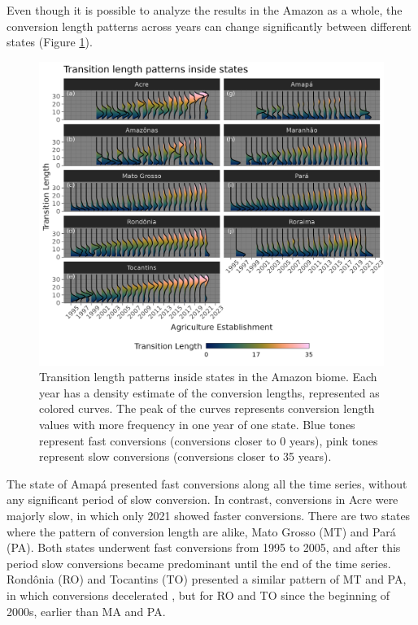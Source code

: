 \documentclass[essd, manuscript]{copernicus}
\begin{document}
Even though it is possible to analyze the results in the Amazon as a whole, the conversion length patterns across years can change significantly between different states (Figure \ref{fig:transridge-plot}).

\begin{figure}[h]
\includegraphics[width=17cm]{figs/trans_ridge} \caption{Transition length patterns inside states in the Amazon biome. Each year has a density estimate of the conversion lengths, represented as colored curves. The peak of the curves represents conversion length values with more frequency in one year of one state. Blue tones represent fast conversions (conversions closer to 0 years), pink tones represent slow conversions (conversions closer to 35 years).}\label{fig:transridge-plot}
\end{figure}

The state of Amapá presented fast conversions along all the time series, without any significant period of slow conversion.
In contrast, conversions in Acre were majorly slow, in which only 2021 showed faster conversions.
There are two states where the pattern of conversion length are alike, Mato Grosso (MT) and Pará (PA).
Both states underwent fast conversions from 1995 to 2005, and after this period slow conversions became predominant until the end of the time series.
Rondônia (RO) and Tocantins (TO) presented a similar pattern of MT and PA, in which conversions decelerated , but for RO and TO since the beginning of 2000s, earlier than MA and PA.
\end{document}

